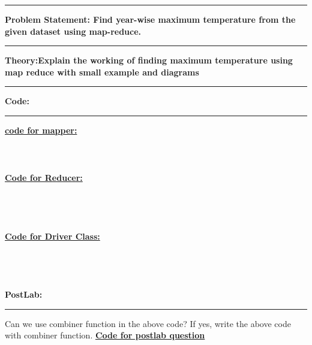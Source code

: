 \documentclass[11pt,article]{memoir}
\begin{document}
\begin{flushleft}
    \pagebreak


\maketitle

\hrule \vspace{0.2cm}
\textbf{Problem Statement: Find year-wise maximum temperature from the given dataset using map-reduce.}\hrule\vspace{0.2cm}
\textbf{Theory:Explain the working of finding maximum temperature using map reduce with small example and diagrams}\hrule\vspace{0.2cm}
\afterpage{\newpage~\newpage}\newpage
\textbf{Code:}\hrule
\vspace{0.5cm}
\textbf{\underline{code for mapper:}}

\begin{lstlisting}[language=java]

	
\end{lstlisting}
\textbf{\underline{Code for Reducer:}}
\begin{lstlisting}[language=java]





\end{lstlisting}
\textbf{\underline{Code for Driver Class:}}
\begin{lstlisting}[language=java]





\end{lstlisting}
\newpage
\textbf{PostLab:}\hrule
Can we use combiner function in the above code? If yes, write the above code with combiner function.
\textbf{\underline{Code for postlab question}}                        
                          
\newpage

\end{flushleft}
\end{document}
